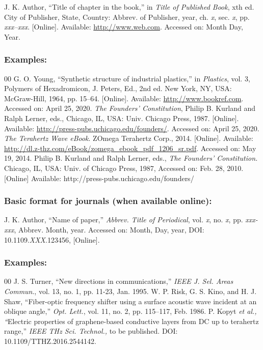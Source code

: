 \documentclass{IEEEoj}
\begin{document}
J. K. Author, ``Title of chapter in the book,'' in \textit{Title of Published Book}, xth ed. City of
Publisher, State, Country: Abbrev. of Publisher, year, ch.
\textit{x}, sec. \textit{x}, pp.
\textit{xxx--xxx}. [Online]. Available: \underline
{http://www.web.com}. Accessed on: Month Day, Year.

\subsubsection*{Examples:}

\begin{thebibliography}{00}
 G. O. Young, ``Synthetic structure of industrial
plastics,'' in \emph{Plastics}, vol. 3, Polymers of Hexadromicon, J.
Peters, Ed., 2nd ed. New York, NY, USA: McGraw-Hill, 1964, pp. 15--64.
[Online]. Available: \underline{http://www.bookref.com}. Accessed on: April 25, 2020.
 \textit{The Founders' Constitution}, Philip B. Kurland and Ralph Lerner, eds., Chicago, IL, USA: Univ. Chicago Press, 1987. [Online]. Available: \underline {http://press-pubs.uchicago.edu/founders/}. Accessed on: April 25, 2020.
 \emph{The Terahertz Wave eBook}. ZOmega Terahertz
Corp., 2014. [Online]. Available: \underline{http://dl.z-thz.com/eBook/zomega\_ebook\_pdf\_1206\_sr.pdf}. Accessed on: May 19, 2014.
 Philip B. Kurland and Ralph Lerner, eds., \textit{The
Founders' Constitution. }Chicago, IL, USA: Univ. of Chicago Press, 1987, Accessed on: Feb. 28, 2010. [Online] Available: {http://press-pubs.uchicago.edu/founders/}
\end{thebibliography}

\subsubsection*{Basic format for journals (when available online):}

J. K. Author, ``Name of paper,'' {\textit{Abbrev. Title of Periodical}}, vol. \textit{x}, no. \textit{x}, pp. {\textit{xxx-xxx}}, Abbrev. Month, year. Accessed on: Month, Day, year, DOI: 10.1109.{\textit{XXX}}.123456, [Online].

\subsubsection*{Examples:}

\begin{thebibliography}{00}
 J. S. Turner, ``New directions in communications,'' \textit{IEEE J. Sel. Areas Commun}., vol. 13, no. 1, pp. 11-23, Jan. 1995. 
 W. P. Risk, G. S. Kino, and H. J. Shaw, ``Fiber-optic frequency shifter using a surface acoustic wave incident at an oblique angle,'' \textit{Opt. Lett.}, vol. 11, no. 2, pp. 115--117, Feb. 1986.
 P. Kopyt \textit{et al., ``}Electric properties of graphene-based conductive layers from DC up to terahertz range,'' \textit{IEEE THz Sci. Technol.,} to be published. DOI: 10.1109/TTHZ.2016.2544142.
\end{thebibliography}
\end{document}
